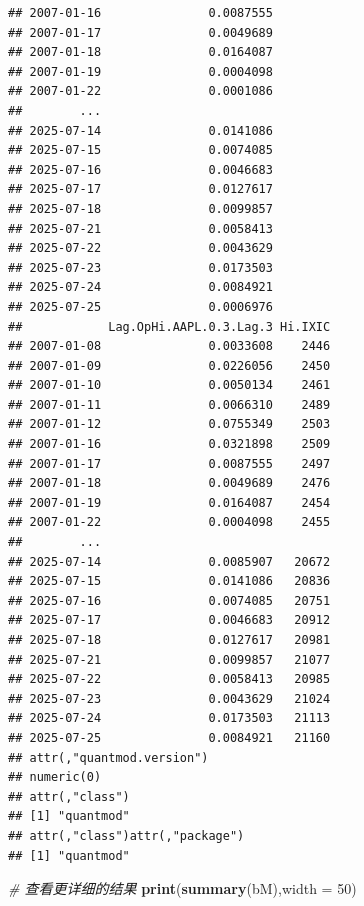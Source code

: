 \documentclass[]{ctexbook}
\newenvironment{Shaded}{\begin{snugshade}}{\end{snugshade}}
\newcommand{\AttributeTok}[1]{\textcolor[rgb]{0.13,0.29,0.53}{#1}}
\newcommand{\CommentTok}[1]{\textcolor[rgb]{0.56,0.35,0.01}{\textit{#1}}}
\newcommand{\DecValTok}[1]{\textcolor[rgb]{0.00,0.00,0.81}{#1}}
\newcommand{\FunctionTok}[1]{\textcolor[rgb]{0.13,0.29,0.53}{\textbf{#1}}}
\newcommand{\NormalTok}[1]{#1}
\begin{document}
\begin{verbatim}
## 2007-01-16               0.0087555
## 2007-01-17               0.0049689
## 2007-01-18               0.0164087
## 2007-01-19               0.0004098
## 2007-01-22               0.0001086
##        ...                        
## 2025-07-14               0.0141086
## 2025-07-15               0.0074085
## 2025-07-16               0.0046683
## 2025-07-17               0.0127617
## 2025-07-18               0.0099857
## 2025-07-21               0.0058413
## 2025-07-22               0.0043629
## 2025-07-23               0.0173503
## 2025-07-24               0.0084921
## 2025-07-25               0.0006976
##            Lag.OpHi.AAPL.0.3.Lag.3 Hi.IXIC
## 2007-01-08               0.0033608    2446
## 2007-01-09               0.0226056    2450
## 2007-01-10               0.0050134    2461
## 2007-01-11               0.0066310    2489
## 2007-01-12               0.0755349    2503
## 2007-01-16               0.0321898    2509
## 2007-01-17               0.0087555    2497
## 2007-01-18               0.0049689    2476
## 2007-01-19               0.0164087    2454
## 2007-01-22               0.0004098    2455
##        ...                                
## 2025-07-14               0.0085907   20672
## 2025-07-15               0.0141086   20836
## 2025-07-16               0.0074085   20751
## 2025-07-17               0.0046683   20912
## 2025-07-18               0.0127617   20981
## 2025-07-21               0.0099857   21077
## 2025-07-22               0.0058413   20985
## 2025-07-23               0.0043629   21024
## 2025-07-24               0.0173503   21113
## 2025-07-25               0.0084921   21160
## attr(,"quantmod.version")
## numeric(0)
## attr(,"class")
## [1] "quantmod"
## attr(,"class")attr(,"package")
## [1] "quantmod"
\end{verbatim}

\begin{Shaded}
\begin{Highlighting}[]
\CommentTok{\# 查看更详细的结果}
\FunctionTok{print}\NormalTok{(}\FunctionTok{summary}\NormalTok{(bM),}\AttributeTok{width =} \DecValTok{50}\NormalTok{)}
\end{Highlighting}
\end{Shaded}
\end{document}
